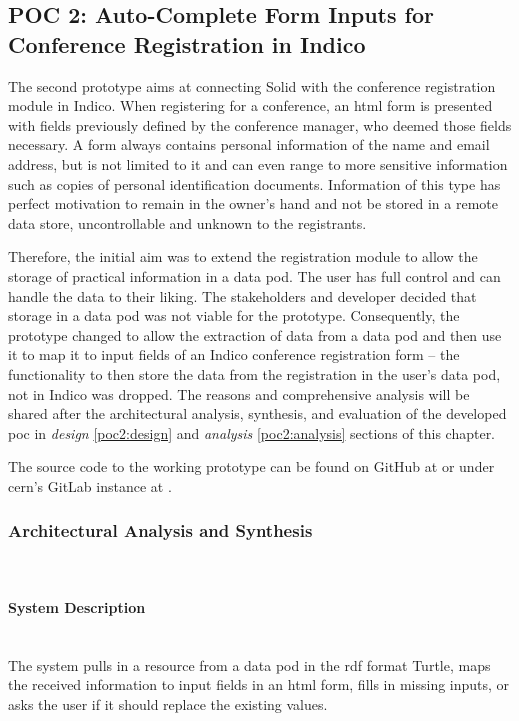 \subsection{POC 2: Auto-Complete Form Inputs for Conference Registration in Indico}

The second prototype aims at connecting Solid with the conference registration module in Indico. When registering for a conference, an \gls{html} form is presented with fields previously defined by the conference manager, who deemed those fields necessary. A form always contains personal information of the name and email address, but is not limited to it and can even range to more sensitive information such as copies of personal identification documents. Information of this type has perfect motivation to remain in the owner's hand and not be stored in a remote data store, uncontrollable and unknown to the registrants.

Therefore, the initial aim was to extend the registration module to allow the storage of practical information in a data pod. The user has full control and can handle the data to their liking. The stakeholders and developer decided that storage in a data pod was not viable for the prototype. Consequently, the prototype changed to allow the extraction of data from a data pod and then use it to map it to input fields of an Indico conference registration form -- the functionality to then store the data from the registration in the user's data pod, not in Indico was dropped. The reasons and comprehensive analysis will be shared after the architectural analysis, synthesis, and evaluation of the developed \gls{poc} in \textit{design} \ref{poc2:design} and \textit{analysis} \ref{poc2:analysis} sections of this chapter.

The source code to the working prototype can be found on GitHub at \cite{solid-autocomplete} or under \gls{cern}'s GitLab instance at \cite{solid-autocomplete-cern}.
\vspace{0.5cm}
\subsubsection{Architectural Analysis and Synthesis}\mbox{}\\
\paragraph{System Description}\mbox{}\\

The system pulls in a resource from a data pod in the \gls{rdf} format Turtle, maps the received information to input fields in an \gls{html} form, fills in missing inputs, or asks the user if it should replace the existing values.
\vspace{0.5cm}
